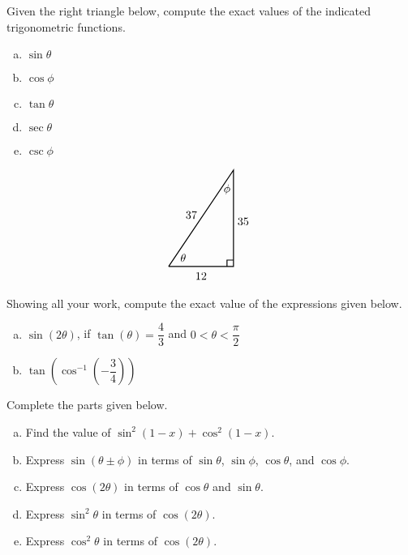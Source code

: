\documentclass[12pt,letterpaper]{exam}
\begin{document}
\begin{questions}
\newpage
\question[10] Given the right triangle below, compute the exact values of the indicated trigonometric functions. \pspace
\begin{minipage}{0.3\textwidth}
        \begin{enumerate}[(a)]
        \item $\sin \theta$
        \item $\cos \phi$
        \item $\tan \theta$
        \item $\sec \theta$
        \item $\csc \phi$
        \end{enumerate}
\end{minipage} \begin{minipage}{0.27\textwidth}        
	\[
	\begin{tikzpicture}
	\draw[line width=0.03cm] (0,0) -- (2,0) -- (2,3) -- (0,0);
	\draw[line width=0.03cm] (1.8,0) -- (1.8,0.2) -- (2,0.2);
	\node at (0.45,0.27) {$\theta$};
	\node at (1.8,2.4) {$\phi$};
	\node at (1,-0.3) {$12$};
	\node at (2.3,1.4) {$35$};
	\node at (0.7,1.6) {$37$};
	\end{tikzpicture}
	\]
\end{minipage}



\newpage
\question[10] Showing all your work, compute the exact value of the expressions given below.
	\begin{enumerate}[(a)]
	\item $\sin(2\theta)$, if $\tan(\theta)= \dfrac{4}{3}$ and $0 < \theta < \dfrac{\pi}{2}$
	\item $\tan \!\left( \cos^{-1} \left( -\dfrac{3}{4} \right) \right)$
	\end{enumerate}



\newpage
\question[10] Complete the parts given below.
	\begin{enumerate}[(a)]
	\item Find the value of $\sin^2(1 - x) + \cos^2(1 - x)$.
	\item Express $\sin(\theta \pm \phi)$ in terms of $\sin \theta$, $\sin \phi$, $\cos \theta$, and $\cos \phi$. 
	\item Express $\cos(2\theta)$ in terms of $\cos \theta$ and $\sin \theta$. 
	\item Express $\sin^2 \theta$ in terms of $\cos(2\theta)$.
	\item Express $\cos^2 \theta$ in terms of $\cos(2\theta)$. 
	\end{enumerate}




\end{questions}
\end{document}
